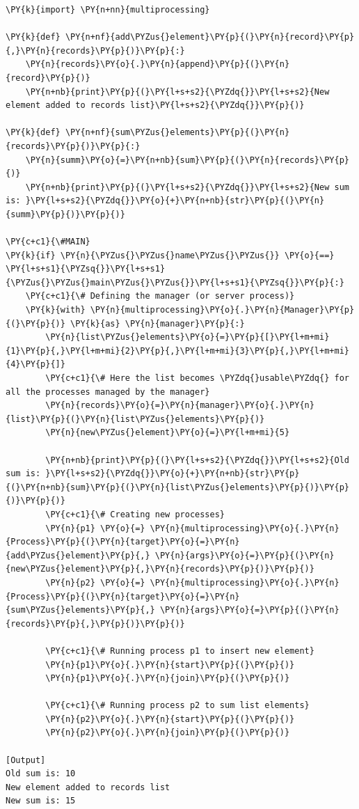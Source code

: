 \begin{Verbatim}[label=\makebox{\url{https://github.com/lucabaldini/cmepda/tree/master/slides/latex/snippets/multiprocessing_manager.py}},commandchars=\\\{\}]
\PY{k}{import} \PY{n+nn}{multiprocessing}

\PY{k}{def} \PY{n+nf}{add\PYZus{}element}\PY{p}{(}\PY{n}{record}\PY{p}{,}\PY{n}{records}\PY{p}{)}\PY{p}{:}
    \PY{n}{records}\PY{o}{.}\PY{n}{append}\PY{p}{(}\PY{n}{record}\PY{p}{)}
    \PY{n+nb}{print}\PY{p}{(}\PY{l+s+s2}{\PYZdq{}}\PY{l+s+s2}{New element added to records list}\PY{l+s+s2}{\PYZdq{}}\PY{p}{)}

\PY{k}{def} \PY{n+nf}{sum\PYZus{}elements}\PY{p}{(}\PY{n}{records}\PY{p}{)}\PY{p}{:}
    \PY{n}{summ}\PY{o}{=}\PY{n+nb}{sum}\PY{p}{(}\PY{n}{records}\PY{p}{)}
    \PY{n+nb}{print}\PY{p}{(}\PY{l+s+s2}{\PYZdq{}}\PY{l+s+s2}{New sum is: }\PY{l+s+s2}{\PYZdq{}}\PY{o}{+}\PY{n+nb}{str}\PY{p}{(}\PY{n}{summ}\PY{p}{)}\PY{p}{)}

\PY{c+c1}{\#MAIN}
\PY{k}{if} \PY{n}{\PYZus{}\PYZus{}name\PYZus{}\PYZus{}} \PY{o}{==} \PY{l+s+s1}{\PYZsq{}}\PY{l+s+s1}{\PYZus{}\PYZus{}main\PYZus{}\PYZus{}}\PY{l+s+s1}{\PYZsq{}}\PY{p}{:}
    \PY{c+c1}{\# Defining the manager (or server process)}
    \PY{k}{with} \PY{n}{multiprocessing}\PY{o}{.}\PY{n}{Manager}\PY{p}{(}\PY{p}{)} \PY{k}{as} \PY{n}{manager}\PY{p}{:}
        \PY{n}{list\PYZus{}elements}\PY{o}{=}\PY{p}{[}\PY{l+m+mi}{1}\PY{p}{,}\PY{l+m+mi}{2}\PY{p}{,}\PY{l+m+mi}{3}\PY{p}{,}\PY{l+m+mi}{4}\PY{p}{]}
        \PY{c+c1}{\# Here the list becomes \PYZdq{}usable\PYZdq{} for all the processes managed by the manager}
        \PY{n}{records}\PY{o}{=}\PY{n}{manager}\PY{o}{.}\PY{n}{list}\PY{p}{(}\PY{n}{list\PYZus{}elements}\PY{p}{)}
        \PY{n}{new\PYZus{}element}\PY{o}{=}\PY{l+m+mi}{5}

        \PY{n+nb}{print}\PY{p}{(}\PY{l+s+s2}{\PYZdq{}}\PY{l+s+s2}{Old sum is: }\PY{l+s+s2}{\PYZdq{}}\PY{o}{+}\PY{n+nb}{str}\PY{p}{(}\PY{n+nb}{sum}\PY{p}{(}\PY{n}{list\PYZus{}elements}\PY{p}{)}\PY{p}{)}\PY{p}{)}
        \PY{c+c1}{\# Creating new processes}
        \PY{n}{p1} \PY{o}{=} \PY{n}{multiprocessing}\PY{o}{.}\PY{n}{Process}\PY{p}{(}\PY{n}{target}\PY{o}{=}\PY{n}{add\PYZus{}element}\PY{p}{,} \PY{n}{args}\PY{o}{=}\PY{p}{(}\PY{n}{new\PYZus{}element}\PY{p}{,}\PY{n}{records}\PY{p}{)}\PY{p}{)}
        \PY{n}{p2} \PY{o}{=} \PY{n}{multiprocessing}\PY{o}{.}\PY{n}{Process}\PY{p}{(}\PY{n}{target}\PY{o}{=}\PY{n}{sum\PYZus{}elements}\PY{p}{,} \PY{n}{args}\PY{o}{=}\PY{p}{(}\PY{n}{records}\PY{p}{,}\PY{p}{)}\PY{p}{)}

        \PY{c+c1}{\# Running process p1 to insert new element}
        \PY{n}{p1}\PY{o}{.}\PY{n}{start}\PY{p}{(}\PY{p}{)}
        \PY{n}{p1}\PY{o}{.}\PY{n}{join}\PY{p}{(}\PY{p}{)}

        \PY{c+c1}{\# Running process p2 to sum list elements}
        \PY{n}{p2}\PY{o}{.}\PY{n}{start}\PY{p}{(}\PY{p}{)}
        \PY{n}{p2}\PY{o}{.}\PY{n}{join}\PY{p}{(}\PY{p}{)}

[Output]
Old sum is: 10
New element added to records list
New sum is: 15
\end{Verbatim}